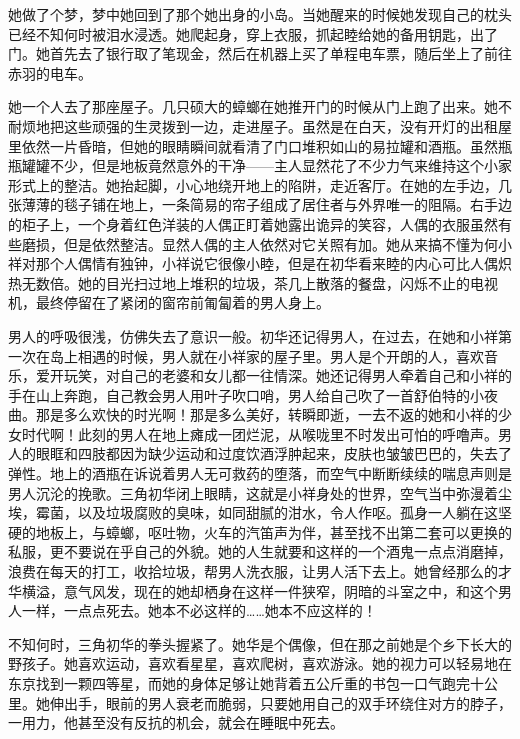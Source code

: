 \documentclass{article}
\begin{document}
她做了个梦，梦中她回到了那个她出身的小岛。当她醒来的时候她发现自己的枕头已经不知何时被泪水浸透。她爬起身，穿上衣服，抓起睦给她的备用钥匙，出了门。她首先去了银行取了笔现金，然后在机器上买了单程电车票，随后坐上了前往赤羽的电车。



她一个人去了那座屋子。几只硕大的蟑螂在她推开门的时候从门上跑了出来。她不耐烦地把这些顽强的生灵拨到一边，走进屋子。虽然是在白天，没有开灯的出租屋里依然一片昏暗，但她的眼睛瞬间就看清了门口堆积如山的易拉罐和酒瓶。虽然瓶瓶罐罐不少，但是地板竟然意外的干净——主人显然花了不少力气来维持这个小家形式上的整洁。她抬起脚，小心地绕开地上的陷阱，走近客厅。在她的左手边，几张薄薄的毯子铺在地上，一条简易的帘子组成了居住者与外界唯一的阻隔。右手边的柜子上，一个身着红色洋装的人偶正盯着她露出诡异的笑容，人偶的衣服虽然有些磨损，但是依然整洁。显然人偶的主人依然对它关照有加。她从来搞不懂为何小祥对那个人偶情有独钟，小祥说它很像小睦，但是在初华看来睦的内心可比人偶炽热无数倍。她的目光扫过地上堆积的垃圾，茶几上散落的餐盘，闪烁不止的电视机，最终停留在了紧闭的窗帘前匍匐着的男人身上。



男人的呼吸很浅，仿佛失去了意识一般。初华还记得男人，在过去，在她和小祥第一次在岛上相遇的时候，男人就在小祥家的屋子里。男人是个开朗的人，喜欢音乐，爱开玩笑，对自己的老婆和女儿都一往情深。她还记得男人牵着自己和小祥的手在山上奔跑，自己教会男人用叶子吹口哨，男人给自己吹了一首舒伯特的小夜曲。那是多么欢快的时光啊！那是多么美好，转瞬即逝，一去不返的她和小祥的少女时代啊！此刻的男人在地上瘫成一团烂泥，从喉咙里不时发出可怕的呼噜声。男人的眼眶和四肢都因为缺少运动和过度饮酒浮肿起来，皮肤也皱皱巴巴的，失去了弹性。地上的酒瓶在诉说着男人无可救药的堕落，而空气中断断续续的喘息声则是男人沉沦的挽歌。三角初华闭上眼睛，这就是小祥身处的世界，空气当中弥漫着尘埃，霉菌，以及垃圾腐败的臭味，如同甜腻的泔水，令人作呕。孤身一人躺在这坚硬的地板上，与蟑螂，呕吐物，火车的汽笛声为伴，甚至找不出第二套可以更换的私服，更不要说在乎自己的外貌。她的人生就要和这样的一个酒鬼一点点消磨掉，浪费在每天的打工，收拾垃圾，帮男人洗衣服，让男人活下去上。她曾经那么的才华横溢，意气风发，现在的她却栖身在这样一件狭窄，阴暗的斗室之中，和这个男人一样，一点点死去。她本不必这样的……她本不应这样的！



不知何时，三角初华的拳头握紧了。她华是个偶像，但在那之前她是个乡下长大的野孩子。她喜欢运动，喜欢看星星，喜欢爬树，喜欢游泳。她的视力可以轻易地在东京找到一颗四等星，而她的身体足够让她背着五公斤重的书包一口气跑完十公里。她伸出手，眼前的男人衰老而脆弱，只要她用自己的双手环绕住对方的脖子，一用力，他甚至没有反抗的机会，就会在睡眠中死去。
\end{document}
